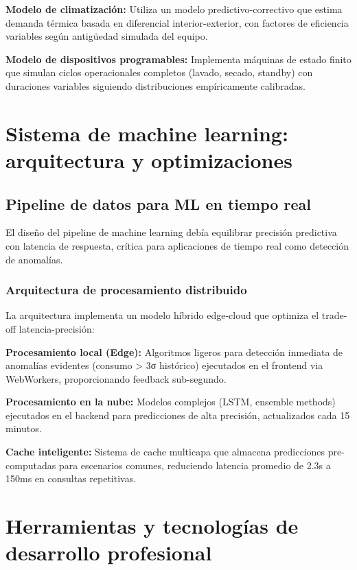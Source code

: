 \textbf{Modelo de climatización:} Utiliza un modelo predictivo-correctivo que estima demanda térmica basada en diferencial interior-exterior, con factores de eficiencia variables según antigüedad simulada del equipo.

\textbf{Modelo de dispositivos programables:} Implementa máquinas de estado finito que simulan ciclos operacionales completos (lavado, secado, standby) con duraciones variables siguiendo distribuciones empíricamente calibradas.

\section{Sistema de machine learning: arquitectura y optimizaciones}

\subsection{Pipeline de datos para ML en tiempo real}

El diseño del pipeline de machine learning debía equilibrar precisión predictiva con latencia de respuesta, crítica para aplicaciones de tiempo real como detección de anomalías.

\subsubsection{Arquitectura de procesamiento distribuido}

La arquitectura implementa un modelo híbrido edge-cloud que optimiza el trade-off latencia-precisión:

\textbf{Procesamiento local (Edge):} Algoritmos ligeros para detección inmediata de anomalías evidentes (consumo > 3σ histórico) ejecutados en el frontend via WebWorkers, proporcionando feedback sub-segundo.

\textbf{Procesamiento en la nube:} Modelos complejos (LSTM, ensemble methods) ejecutados en el backend para predicciones de alta precisión, actualizados cada 15 minutos.

\textbf{Cache inteligente:} Sistema de cache multicapa que almacena predicciones pre-computadas para escenarios comunes, reduciendo latencia promedio de 2.3s a 150ms en consultas repetitivas.

\section{Herramientas y tecnologías de desarrollo profesional}

